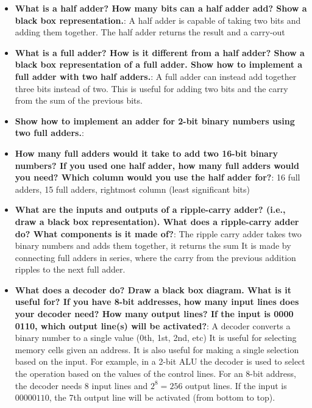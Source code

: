 \documentclass{report}
\begin{document}
    \pagebreak 
    \begin{itemize}
        \item \textbf{What is a half adder? How many bits can a half adder add? Show a black box representation.}: A half adder is capable of taking two bits and adding them together. The half adder returns the result and a carry-out
        \item \textbf{What is a full adder? How is it different from a half adder? Show a black box representation of a full adder. Show how to implement a full adder with two half adders.}:
            A full adder can instead add together three bits instead of two. This is useful for adding two bits and the carry from the sum of the previous bits.
        \item \textbf{Show how to implement an adder for 2-bit binary numbers using two full adders.}:
        \item \textbf{How many full adders would it take to add two 16-bit binary numbers? If you used one half adder, how many full adders would you need? Which column would you use the half adder for?}:
            16 full adders, 15 full adders, rightmost column (least significant bits)
        \item \textbf{What are the inputs and outputs of a ripple-carry adder? (i.e., draw a black box representation). What does a ripple-carry adder do? What components is it made of?}:
            The ripple carry adder takes two binary numbers and adds them together, it returns the sum
            \bigbreak \noindent 
            It is made by connecting full adders in series, where the carry from the previous addition ripples to the next full adder.
        \item \textbf{What does a decoder do? Draw a black box diagram. What is it useful for?       If you have 8-bit addresses, how many input lines does your decoder need? How many output lines? If the input is 0000 0110, which output line(s) will be activated?}:
            A decoder converts a binary number to a single value (0th, 1st, 2nd, etc)
            \bigbreak \noindent 
            It is useful for selecting memory cells given an address. It is also useful for making a single selection based on the input. For example, in a 2-bit ALU the decoder is used to select the operation based on the values of the control lines.
            \bigbreak \noindent 
            For an 8-bit address, the decoder needs 8 input lines and $2^{8 } = 256$ output lines. If the input is $0000 0110$, the 7th output line will be activated (from bottom to top).

\end{itemize}
\end{document}
